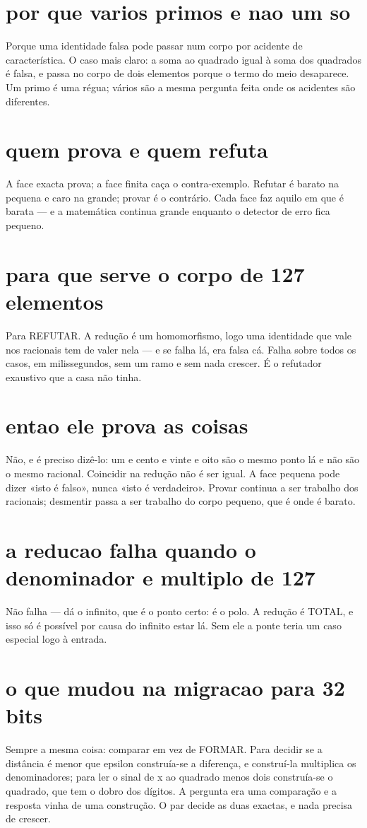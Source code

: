 \documentclass[11pt,a4paper]{article}
\begin{document}
\section{por que varios primos e nao um so}
Porque uma identidade falsa pode passar num corpo por acidente de característica. O caso
mais claro: a soma ao quadrado igual à soma dos quadrados é falsa, e passa no corpo de dois
elementos porque o termo do meio desaparece. Um primo é uma régua; vários são a mesma
pergunta feita onde os acidentes são diferentes.

\section{quem prova e quem refuta}
A face exacta prova; a face finita caça o contra-exemplo. Refutar é barato na pequena e
caro na grande; provar é o contrário. Cada face faz aquilo em que é barata — e a matemática
continua grande enquanto o detector de erro fica pequeno.

\section{para que serve o corpo de 127 elementos}
Para REFUTAR. A redução é um homomorfismo, logo uma identidade que vale nos racionais tem
de valer nela — e se falha lá, era falsa cá. Falha sobre todos os casos, em milissegundos,
sem um ramo e sem nada crescer. É o refutador exaustivo que a casa não tinha.

\section{entao ele prova as coisas}
Não, e é preciso dizê-lo: um e cento e vinte e oito são o mesmo ponto lá e não são o mesmo
racional. Coincidir na redução não é ser igual. A face pequena pode dizer «isto é falso»,
nunca «isto é verdadeiro». Provar continua a ser trabalho dos racionais; desmentir passa a
ser trabalho do corpo pequeno, que é onde é barato.

\section{a reducao falha quando o denominador e multiplo de 127}
Não falha — dá o infinito, que é o ponto certo: é o polo. A redução é TOTAL, e isso só é
possível por causa do infinito estar lá. Sem ele a ponte teria um caso especial logo à
entrada.

\section{o que mudou na migracao para 32 bits}
Sempre a mesma coisa: comparar em vez de FORMAR. Para decidir se a distância é menor que
epsilon construía-se a diferença, e construí-la multiplica os denominadores; para ler o
sinal de x ao quadrado menos dois construía-se o quadrado, que tem o dobro dos dígitos. A
pergunta era uma comparação e a resposta vinha de uma construção. O par decide as duas
exactas, e nada precisa de crescer.
\end{document}
